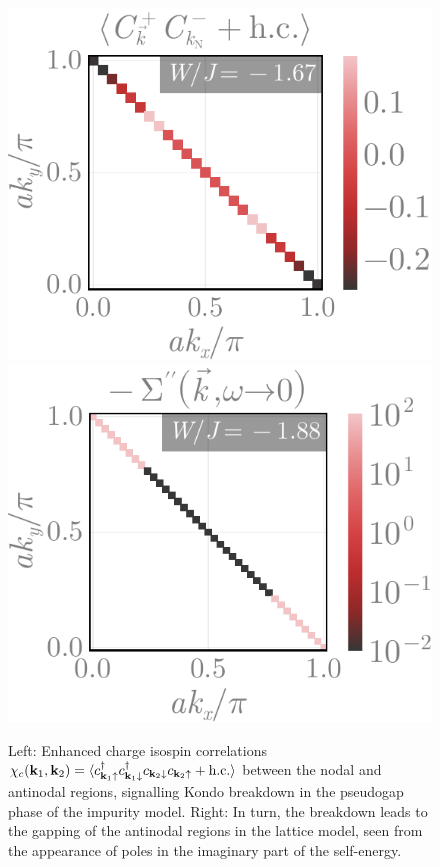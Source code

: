 \documentclass[%
 reprint,
superscriptaddress,
groupedaddress,
 amsmath,amssymb,
 aps,
prl,superscriptaddress
]{revtex4-2}
\begin{document}
\begin{figure}
    \centering
    \includegraphics[width=0.49\linewidth]{cfnode-2.pdf}
    \includegraphics[width=0.49\linewidth]{selfEnergyKspace-3.pdf}
    \caption{Left: Enhanced charge isospin correlations $\chi_c({\bf k}_1, {\bf k}_2) = \braket{c^\dagger_{{\bf k}_1\uparrow}c^\dagger_{{\bf k}_1\downarrow}c_{{\bf k}_2\downarrow}c_{{\bf k}_2\uparrow} + \text{h.c.}}$ between the nodal and antinodal regions, signalling Kondo breakdown in the pseudogap phase of the impurity model. Right: In turn, the breakdown leads to the gapping of the antinodal regions in the lattice model, seen from the appearance of poles in the imaginary part of the self-energy.}
    \label{chargeCorr}
\end{figure}
\end{document}
